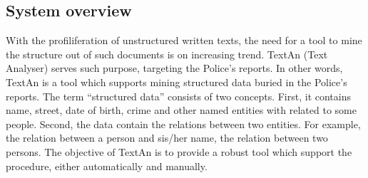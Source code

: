 \documentclass[12pt,a4paper]{report}
\begin{document}




% 



\subsection{System overview}




% 




With the profiliferation of unstructured written texts, the need for a tool to mine the structure out of such documents is on increasing trend. 
TextAn (Text Analyser) serves such purpose, targeting the Police's reports. 
In other words, TextAn is a tool which supports mining structured data buried in the Police's reports. The term ``structured data'' consists of two concepts. 
First, it contains name, street, date of birth, crime and other named entities with related to some people. 
Second, the data contain the relations between two entities. 
For example, the relation between a person and sis/her name, the relation between two persons. The objective of TextAn is to provide a robust tool which support the procedure, either automatically and manually.
\end{document}
